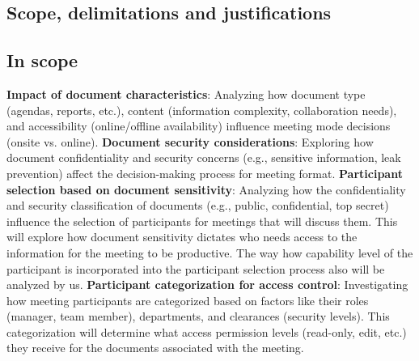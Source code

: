 \begin{spacing}{1.0}
    \section{Scope, delimitations and justifications}

    \subsection{In scope}
    \textbf{Impact of document characteristics}: Analyzing how document type (agendas, reports, etc.),   content (information complexity, collaboration needs), and accessibility (online/offline availability) influence meeting mode decisions (onsite vs. online).
    \newline\newline \textbf{Document security considerations}: Exploring how document confidentiality and security concerns (e.g., sensitive information, leak prevention) affect the decision-making process for meeting format.
    \newline\newline \textbf{Participant selection based on document sensitivity}: Analyzing how the confidentiality and security classification of documents (e.g., public, confidential, top secret) influence the selection of participants for meetings that will discuss them. This will explore how document sensitivity dictates who needs access to the information for the meeting to be productive. The way how capability level of the participant is incorporated into the participant selection process also will be analyzed by us.
    \newline\newline \textbf{Participant categorization for access control}: Investigating how meeting participants are categorized based on factors like their roles (manager, team member), departments, and clearances (security levels). This categorization will determine what access permission levels (read-only, edit, etc.) they receive for the documents associated with the meeting.


\end{spacing}
